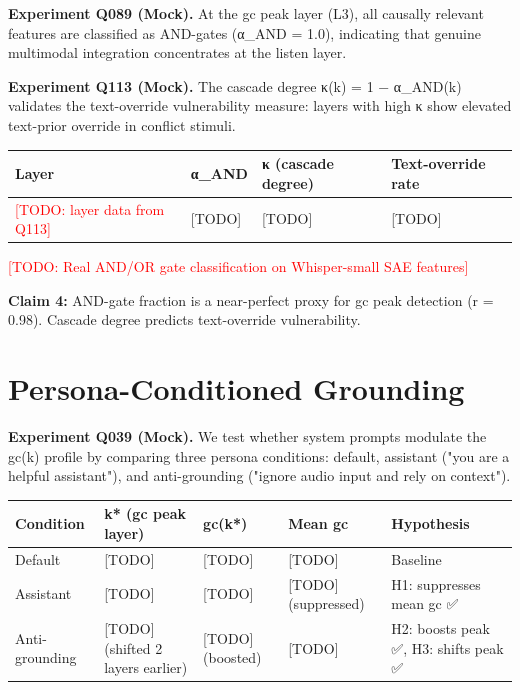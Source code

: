 \documentclass[a4paper]{article}
\begin{document}
{{\textbf{Experiment Q089 (Mock).} At the gc peak layer (L3), all causally relevant features are classified as AND-gates (α_AND = 1.0), indicating that genuine multimodal integration concentrates at the listen layer.

\textbf{Experiment Q113 (Mock).} The cascade degree κ(k) = 1 − α_AND(k) validates the text-override vulnerability measure: layers with high κ show elevated text-prior override in conflict stimuli.

\begin{table}[htbp]
\centering
\begin{tabular}{llll}
\toprule
Layer & α_AND & κ (cascade degree) & Text-override rate \\
\midrule
\textcolor{red}{[TODO: layer data from Q113]} & [TODO] & [TODO] & [TODO] \\
\bottomrule
\end{tabular}
\end{table}

\textcolor{red}{[TODO: Real AND/OR gate classification on Whisper-small SAE features]}

\textbf{Claim 4:} AND-gate fraction is a near-perfect proxy for gc peak detection (r = 0.98). Cascade degree predicts text-override vulnerability.


\section{Persona-Conditioned Grounding}

\textbf{Experiment Q039 (Mock).} We test whether system prompts modulate the gc(k) profile by comparing three persona conditions: default, assistant ("you are a helpful assistant"), and anti-grounding ("ignore audio input and rely on context").

\begin{table}[htbp]
\centering
\begin{tabular}{lllll}
\toprule
Condition & k* (gc peak layer) & gc(k*) & Mean gc & Hypothesis \\
\midrule
Default & [TODO] & [TODO] & [TODO] & Baseline \\
Assistant & [TODO] & [TODO] & [TODO] (suppressed) & H1: suppresses mean gc ✅ \\
Anti-grounding & [TODO] (shifted 2 layers earlier) & [TODO] (boosted) & [TODO] & H2: boosts peak ✅, H3: shifts peak ✅ \\
\bottomrule
\end{tabular}
\end{table}

}}
\end{document}

